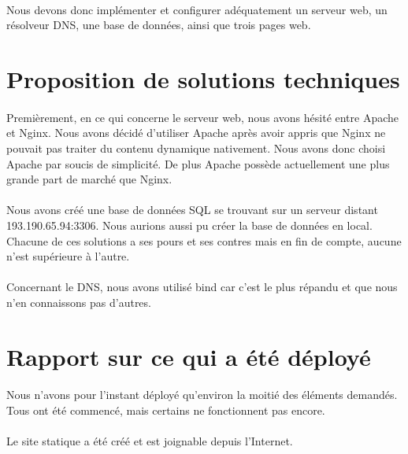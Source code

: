 \documentclass[a4paper,12pt]{article}
\begin{document}
	\paragraph{} Nous devons donc implémenter et configurer adéquatement un serveur web, un résolveur DNS, une base de données, ainsi que trois pages web.
	
	
\section{Proposition de solutions techniques}
	\paragraph{} Premièrement, en ce qui concerne le serveur web, nous avons hésité entre Apache et Nginx. Nous avons décidé d'utiliser Apache après avoir appris que Nginx ne pouvait pas traiter du contenu dynamique nativement. Nous avons donc choisi Apache par soucis de simplicité. De plus Apache possède actuellement une plus grande part de marché que Nginx.
	\paragraph{} Nous avons créé une base de données SQL se trouvant sur un serveur distant 193.190.65.94:3306. Nous aurions aussi pu créer la base de données en local. Chacune de ces solutions a ses pours et ses contres mais en fin de compte, aucune n'est supérieure à l'autre.
	\paragraph{} Concernant le DNS, nous avons utilisé bind car c'est le plus répandu et que nous n'en connaissons pas d'autres.
		
\section{Rapport sur ce qui a été déployé}
	\paragraph{} Nous n'avons pour l'instant déployé qu'environ la moitié des éléments demandés. Tous ont été commencé, mais certains ne fonctionnent pas encore.
	\paragraph{} Le site statique a été créé et est joignable depuis l'Internet.
\end{document}
